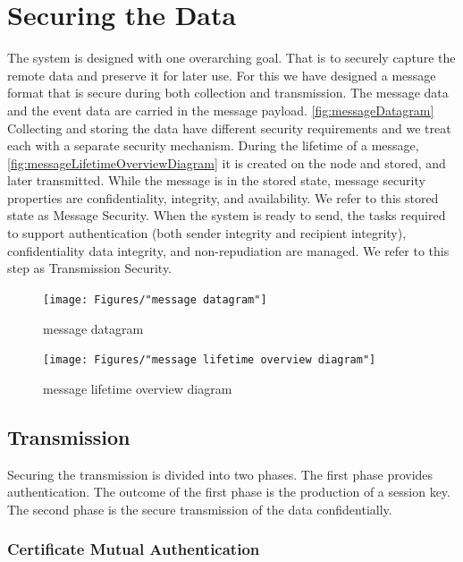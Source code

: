 \chapter{Securing the Data}
The system is designed with one overarching goal. That is to securely capture the remote data and preserve it for later use. For this we have designed a message format that is secure during both collection and transmission. The message data and the event data are carried in the message payload. \autoref{fig:messageDatagram} 
Collecting and storing the data have different security requirements and we treat each with a separate security mechanism. 
During the lifetime of a message, \autoref{fig:messageLifetimeOverviewDiagram} it is created on the node and stored, and later transmitted. While the message is in the stored state, message security properties are confidentiality, integrity, and availability. We refer to this stored state as Message Security. When the system is ready to send, the tasks required to support authentication (both sender integrity and recipient integrity), confidentiality data integrity, and non-repudiation are managed. We refer to this step as Transmission Security.
\begin{figure}
\centering
\texttt{[image: Figures/"message datagram"]}
\caption{message datagram}
\label{fig:messageDatagram}
\end{figure}

\begin{figure}
\centering
\texttt{[image: Figures/"message lifetime overview diagram"]}
\caption{message lifetime overview diagram}
\label{fig:messageLifetimeOverviewDiagram}
\end{figure}

\section{Transmission}
Securing the transmission is divided into two phases. The first phase provides authentication. The outcome of the first phase is the production of a session key. The second phase is the secure transmission of the data confidentially. 
\subsection{Certificate Mutual Authentication}
